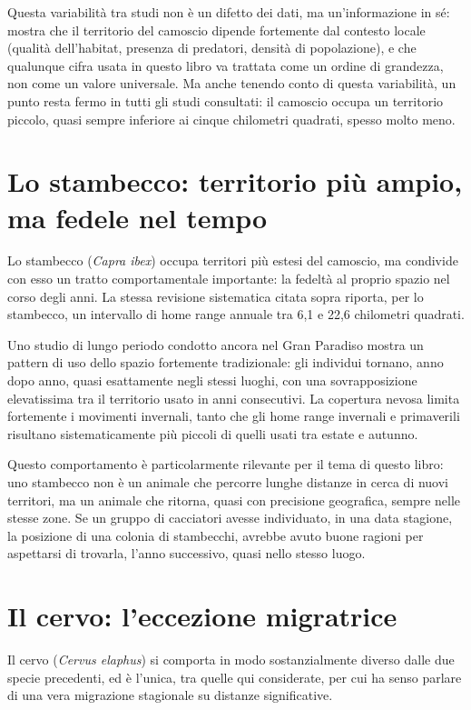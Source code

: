 Questa variabilità tra studi non è un difetto dei dati, ma un'informazione in sé: mostra che il territorio del camoscio dipende fortemente dal contesto locale (qualità dell'habitat, presenza di predatori, densità di popolazione), e che qualunque cifra usata in questo libro va trattata come un ordine di grandezza, non come un valore universale. Ma anche tenendo conto di questa variabilità, un punto resta fermo in tutti gli studi consultati: il camoscio occupa un territorio piccolo, quasi sempre inferiore ai cinque chilometri quadrati, spesso molto meno.

\section{Lo stambecco: territorio più ampio, ma fedele nel tempo}

Lo stambecco (\textit{Capra ibex}) occupa territori più estesi del camoscio, ma condivide con esso un tratto comportamentale importante: la fedeltà al proprio spazio nel corso degli anni. La stessa revisione sistematica citata sopra riporta, per lo stambecco, un intervallo di home range annuale tra 6,1 e 22,6 chilometri quadrati.

Uno studio di lungo periodo condotto ancora nel Gran Paradiso mostra un pattern di uso dello spazio fortemente tradizionale: gli individui tornano, anno dopo anno, quasi esattamente negli stessi luoghi, con una sovrapposizione elevatissima tra il territorio usato in anni consecutivi. La copertura nevosa limita fortemente i movimenti invernali, tanto che gli home range invernali e primaverili risultano sistematicamente più piccoli di quelli usati tra estate e autunno.

Questo comportamento è particolarmente rilevante per il tema di questo libro: uno stambecco non è un animale che percorre lunghe distanze in cerca di nuovi territori, ma un animale che ritorna, quasi con precisione geografica, sempre nelle stesse zone. Se un gruppo di cacciatori avesse individuato, in una data stagione, la posizione di una colonia di stambecchi, avrebbe avuto buone ragioni per aspettarsi di trovarla, l'anno successivo, quasi nello stesso luogo.

\section{Il cervo: l'eccezione migratrice}

Il cervo (\textit{Cervus elaphus}) si comporta in modo sostanzialmente diverso dalle due specie precedenti, ed è l'unica, tra quelle qui considerate, per cui ha senso parlare di una vera migrazione stagionale su distanze significative.

